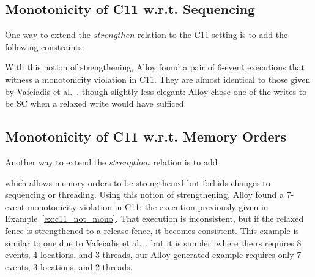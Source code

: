 \subsection{Monotonicity of C11 w.r.t. Sequencing}
\label{sec:Q3_c11_seq}
One way to extend the $strengthen$ relation to the C11 setting is to
add the following constraints:
%
%
With this notion of strengthening, Alloy found a pair of 6-event
executions that witness a monotonicity violation in C11. They are
almost identical to those given by Vafeiadis et
al.~\cite[Fig.~1]{vafeiadis+15}, though slightly less elegant: Alloy
chose one of the writes to be SC when a relaxed write would have
sufficed.

\subsection{Monotonicity of C11 w.r.t. Memory Orders}
\label{sec:Q3_c11_mo}
Another way to extend the $strengthen$ relation is to add
%
%
which allows memory orders to be strengthened but forbids changes
to sequencing or threading. Using this notion of strengthening, Alloy
found a 7-event monotonicity violation in C11: the execution
previously given in Example~\ref{ex:c11_not_mono}. That execution is
inconsistent, but if the relaxed fence is strengthened to a release
fence, it becomes consistent. This example is similar to one due to
Vafeiadis et al.~\cite[\S3, \emph{Strengthening is
Unsound}]{vafeiadis+15}, but it is simpler: where theirs requires 8
events, 4 locations, and 3 threads, our Alloy-generated example
requires only 7 events, 3 locations, and 2 threads.

